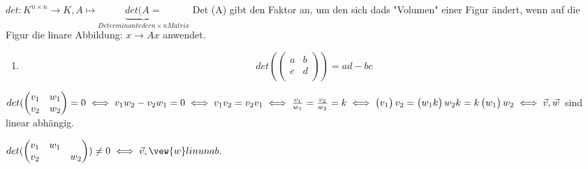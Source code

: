 \documentclass{../tudscript}
\begin{document}
            $det: K^{n \times n} \rightarrow K, A \mapsto \underbrace{det(A=}_{Determinante der n \times n Matrix}$
            Det (A) gibt den Faktor an, um den sich dads "Volumen" einer Figur ändert, wenn auf die Figur die linare Abbildung: $x \rightarrow Ax$ anwendet.
            
          \begin{enumerate}
          \item \begin{equation*}
            det(  \begin{pmatrix}
                a & b \\
                c & d \\        
                \end{pmatrix} ) = ad -bc
            \end{equation*}            
        
         \end{enumerate}            
      $det( \begin{pmatrix} 
        v_1 & w_1 \\
        v_2 & w_2 \\
    \end{pmatrix} = 0 \iff v_1 w_2 - v_2 w_1 = 0 \iff v_1 v_2 = v_2 v_1 \iff \frac{v_1}{w_1} = \frac{v_2}{w_2} = k \iff \begin{pmatrix}v_1\end{pmatrix}{v_2} = \begin{pmatrix}w_1 k\end{pmatrix}{w_2 k} = k \begin{pmatrix}w_1\end{pmatrix}{w_2} \iff \vec{v}, \vec{w}$ sind linear abhängig.

    $det (\begin{pmatrix} v_1 & w_1 \\ v_2 && w_2 \end{pmatrix}) \neq 0 \iff \vec{v}, \vew{w} lin unab.$
\end{document}
